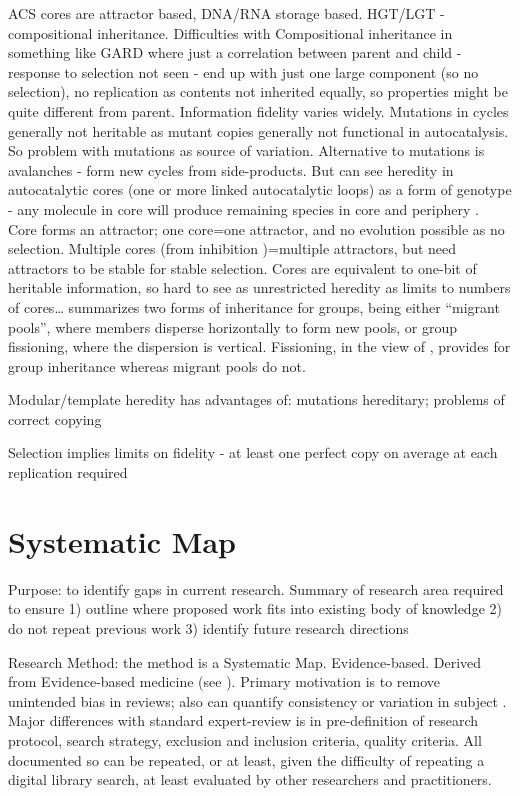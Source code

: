 \cite{Vasas2012a} ACS cores are attractor based, DNA/RNA storage based. HGT/LGT - compositional inheritance.
Difficulties with Compositional inheritance in something like GARD where just a correlation between parent and child - response to selection not seen \parencite{Vasas2015} - end up with just one large component (so no selection), no replication as contents not inherited equally, so properties might be quite different from parent. Information fidelity varies widely. Mutations in cycles \parencite{Vasas2012a} generally not heritable as mutant copies generally not functional in autocatalysis. So problem with mutations as source of variation. Alternative to mutations is avalanches - form new cycles from side-products.
But can see heredity in autocatalytic cores (one or more linked autocatalytic loops) as a form of genotype - any molecule in core will produce remaining species in core and periphery \parencite{Vasas2012a}. Core forms an attractor; one core=one attractor, and no evolution possible as no selection. Multiple cores (from inhibition \cite{Vasas2012a})=multiple attractors, but need attractors to be stable for stable selection. Cores are equivalent to one-bit of heritable information, so hard to see as unrestricted heredity as limits to numbers of cores…
\cite{Watson2015} summarizes two forms of inheritance for groups, being either ``migrant pools'', where members disperse horizontally to form new pools, or group fissioning, where the dispersion is vertical. Fissioning, in the view of \cite{Watson2015}, provides for group inheritance whereas migrant pools do not.

Modular/template heredity has advantages of: mutations hereditary; problems of correct copying \parencite{Eigen1977}

Selection implies limits on fidelity - at least one perfect copy on average at each replication required \parencite{Eigen1977}


\section{Systematic Map}

Purpose: to identify gaps in current research. Summary of research area required to ensure 1) outline where proposed work fits into existing body of knowledge 2) do not repeat previous work 3) identify future research directions

Research Method: the method is a Systematic Map. Evidence-based. Derived from Evidence-based medicine (see \cite{Cochrane:2011qy, CRD:2008fj}). Primary motivation is to remove unintended bias in reviews; also can quantify consistency or variation in subject \parencite{Kitchenham:2007nx}.
Major differences with standard expert-review is in pre-definition of research protocol, search strategy, exclusion and inclusion criteria, quality criteria. All documented so can be repeated, or at least, given the difficulty of repeating a digital library search, at least evaluated by other researchers and practitioners.
